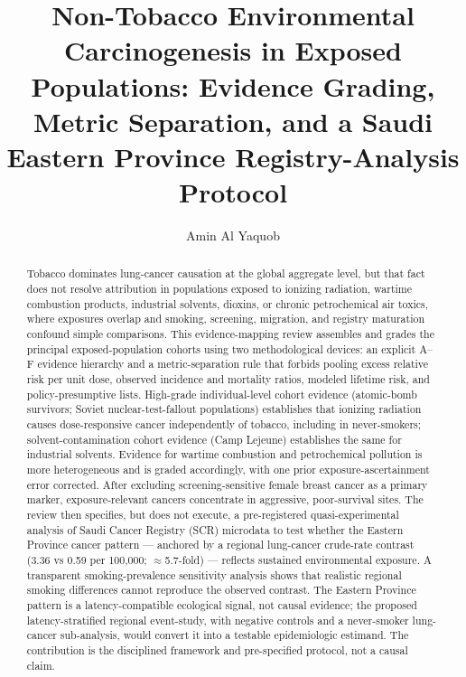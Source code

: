 \documentclass[3p,times]{elsarticle}
\begin{document}
\begin{frontmatter}

\title{Non-Tobacco Environmental Carcinogenesis in Exposed Populations: Evidence Grading, Metric Separation, and a Saudi Eastern Province Registry-Analysis Protocol}

\author{Amin Al Yaquob}

\begin{abstract}
Tobacco dominates lung-cancer causation at the global aggregate level, but that fact does not resolve attribution in populations exposed to ionizing radiation, wartime combustion products, industrial solvents, dioxins, or chronic petrochemical air toxics, where exposures overlap and smoking, screening, migration, and registry maturation confound simple comparisons. This evidence-mapping review assembles and grades the principal exposed-population cohorts using two methodological devices: an explicit A--F evidence hierarchy and a metric-separation rule that forbids pooling excess relative risk per unit dose, observed incidence and mortality ratios, modeled lifetime risk, and policy-presumptive lists. High-grade individual-level cohort evidence (atomic-bomb survivors; Soviet nuclear-test-fallout populations) establishes that ionizing radiation causes dose-responsive cancer independently of tobacco, including in never-smokers; solvent-contamination cohort evidence (Camp Lejeune) establishes the same for industrial solvents. Evidence for wartime combustion and petrochemical pollution is more heterogeneous and is graded accordingly, with one prior exposure-ascertainment error corrected. After excluding screening-sensitive female breast cancer as a primary marker, exposure-relevant cancers concentrate in aggressive, poor-survival sites. The review then specifies, but does not execute, a pre-registered quasi-experimental analysis of Saudi Cancer Registry (SCR) microdata to test whether the Eastern Province cancer pattern --- anchored by a regional lung-cancer crude-rate contrast (3.36 vs 0.59 per 100,000; $\approx$5.7-fold) --- reflects sustained environmental exposure. A transparent smoking-prevalence sensitivity analysis shows that realistic regional smoking differences cannot reproduce the observed contrast. The Eastern Province pattern is a latency-compatible ecological signal, not causal evidence; the proposed latency-stratified regional event-study, with negative controls and a never-smoker lung-cancer sub-analysis, would convert it into a testable epidemiologic estimand. The contribution is the disciplined framework and pre-specified protocol, not a causal claim.
\end{abstract}


\end{frontmatter}
\end{document}
